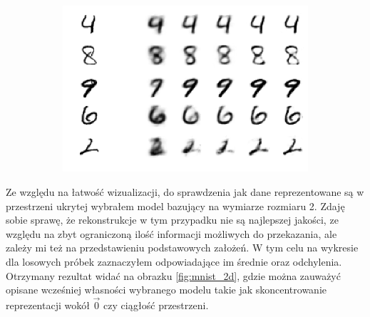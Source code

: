 \begin{figure}[h!]
  \centering
  \begin{subfigure}[b]{0.45\linewidth}
    \caption{}
  \end{subfigure}
  \begin{subfigure}[b]{0.45\linewidth}
    \caption{}
  \end{subfigure}
  \begin{subfigure}[b]{0.5\linewidth}
    \includegraphics[width=1.0\textwidth]{images/mnist_recon_v2}
    \caption{}
  \end{subfigure}
  \caption{}
  \label{fig:mnist_recon}
\end{figure}

Ze względu na łatwość wizualizacji, do sprawdzenia jak dane reprezentowane są w przestrzeni ukrytej wybrałem model bazujący na wymiarze rozmiaru 2. Zdaję sobie sprawę, że rekonstrukcje w tym przypadku nie są najlepszej jakości, ze względu na zbyt ograniczoną ilość informacji możliwych do przekazania, ale zależy mi też na przedstawieniu podstawowych założeń. W tym celu na wykresie dla losowych próbek zaznaczyłem odpowiadające im średnie oraz odchylenia. Otrzymany rezultat widać na obrazku \ref{fig:mnist_2d}, gdzie można zauważyć opisane wcześniej własności wybranego modelu takie jak skoncentrowanie reprezentacji wokół $\vec{0}$ czy ciągłość przestrzeni.

